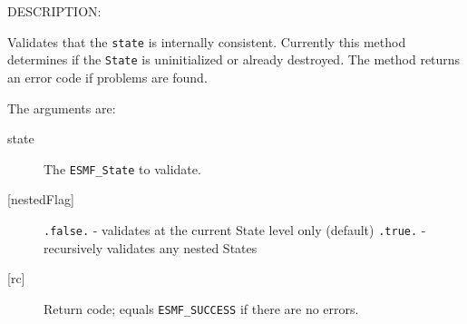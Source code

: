 {\sf DESCRIPTION:\\ }


       Validates that the {\tt state} is internally consistent.
        Currently this method determines if the {\tt State} is uninitialized 
        or already destroyed.  The method returns an error code if problems 
        are found.  
  
       The arguments are:
       \begin{description}
       \item[state]
         The {\tt ESMF\_State} to validate.
       \item[{[nestedFlag]}]
         {\tt .false.} - validates at the current State level only (default)
         {\tt .true.} - recursively validates any nested States
       \item[{[rc]}]
         Return code; equals {\tt ESMF\_SUCCESS} if there are no errors.
       \end{description}
  
  
\setlength{\parskip}{\oldparskip}
\setlength{\parindent}{\oldparindent}
\setlength{\baselineskip}{\oldbaselineskip}
